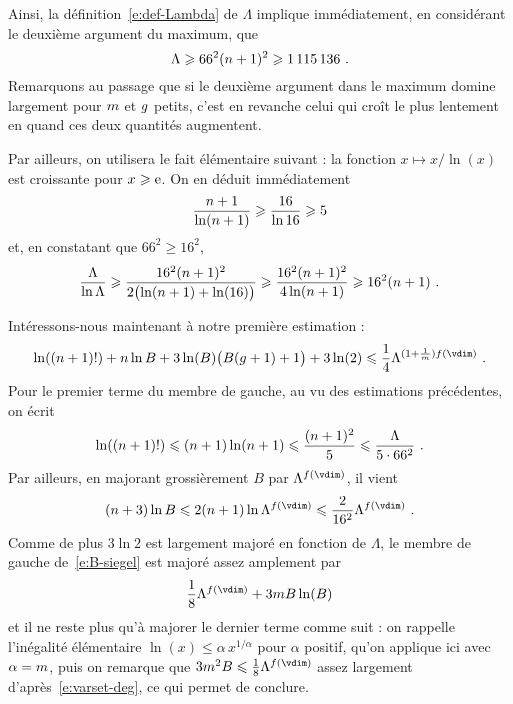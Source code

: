 Ainsi, la définition~\eqref{e:def-Lambda} de \( \Lambda \) implique
immédiatement, en considérant le deuxième argument du maximum, que
\begin{equation}
  \Lambda \geqslant 66^2 (n + 1)^2 \geqslant \num{1115136}
  \text{ .}
\end{equation}
Remarquons au passage que si le deuxième argument dans le maximum domine
largement pour \( m \) et \( g \) petits, c'est en revanche celui
qui croît le plus lentement en quand ces deux quantités augmentent.

Par ailleurs, on utilisera le fait élémentaire suivant : la fonction \( x
  \mapsto x / \ln(x) \) est croissante pour \( x \geqslant \mathrm e \). On en déduit
immédiatement
\begin{equation}
  \frac{ n + 1 }{ \ln( n + 1 ) }
  \geqslant
  \frac{ 16 }{ \ln 16 }
  \geqslant
  5
\end{equation}
et, en constatant que \( 66^2 \ge 16^2 \),
\begin{equation}
  \frac{ \Lambda }{ \ln \Lambda }
  \geqslant
  \frac{ 16^2 (n + 1)^2 }{ 2 \bigl( \ln(n + 1) + \ln(16) \bigr) }
  \geqslant
  \frac{ 16^2 (n + 1)^2 }{ 4 \ln(n + 1) }
  \geqslant
  16^2 (n + 1)
  \text{ .}
\end{equation}

Intéressons-nous maintenant à notre première estimation  :
\begin{equation} \label{e:B-siegel}
  \ln((\dimp+1)!) + \dimp \ln B
  + 3 \ln(B) \bigl( B(\genre+1) + 1 \bigr) + 3 \ln(2)
  \le
  \frac14 \Lambda^{(1 + \frac1\puiss) f(\vdim)}
  \pmm.
\end{equation}
Pour le premier terme du membre de gauche, au vu des estimations précédentes,
on écrit
\begin{equation}
  \ln((n+1)!)
  \leqslant
  (n+1) \ln (n+1)
  \leqslant
  \frac{ (n+1)^2 }5
  \leqslant
  \frac{ \Lambda }{ 5 \cdot 66^2 }
  \text{ .}
\end{equation}
Par ailleurs, en majorant grossièrement \( B \) par \( \Lambda^{f(\vdim)} \),
il vient
\begin{equation}
  (\dimp + 3) \ln B
  \le
  2(\dimp + 1) \ln \Lambda^{f(\vdim)}
  \le
  \frac{ 2 }{ 16^2 } \Lambda^{f(\vdim)}
  \pmm.
\end{equation}
Comme de plus \( 3 \ln 2 \) est largement majoré en fonction de \( \Lambda \),
le membre de gauche de~\eqref{e:B-siegel} est majoré assez amplement par
\begin{equation}
  \frac18 \Lambda^{f(\vdim)} + 3 \puiss B \ln(B)
\end{equation}
et il ne reste plus qu'à majorer le dernier terme comme suit : on rappelle
l'inégalité élémentaire \( \ln(x) \le \alpha \, x^{1/\alpha} \) pour \( \alpha
\) positif, qu'on applique ici avec \( \alpha = m \), puis on remarque
que \( 3 \puiss^2 B \le \frac18 \Lambda^{f(\vdim)} \) assez largement
d'après~\eqref{e:varset-deg}, ce qui permet de conclure.

